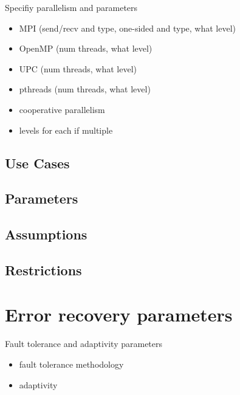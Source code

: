 \documentclass{book}
\begin{document}
Specifiy parallelism and parameters

\begin{itemize}
\item MPI (send/recv and type, one-sided and type, what level)
\item OpenMP (num threads, what level)
\item UPC (num threads, what level)
\item pthreads (num threads, what level)
\item cooperative parallelism
\item levels for each if multiple
\end{itemize}

\subsection{Use Cases}
\subsection{Parameters}
\subsection{Assumptions}
\subsection{Restrictions}

\section{Error recovery parameters} \label{s:error}

Fault tolerance and adaptivity parameters

\begin{itemize}
\item fault tolerance methodology
\item adaptivity
\end{itemize}
\end{document}
